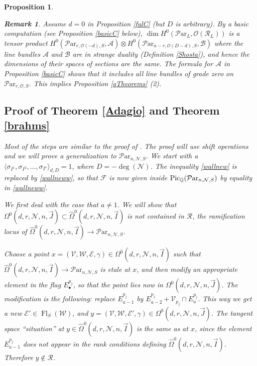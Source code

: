 \documentclass[11pt]{amsart}
\newcommand\bull{{\bullet}}
\newcommand\mf{\mathcal{F}}
\newcommand\Pic{\operatorname{Pic}}
\newcommand\me{\mathcal{E}}
\newcommand\Fl{\operatorname{Fl}}
\newcommand\mv{\mathcal{V}}
\newcommand\ma{\mathcal{A}}
\newcommand\mb{\mathcal{B}}
\newcommand\mw{\mathcal{W}}
\newcommand\mn{\mathcal{N}}
\newcommand\ParL{\mathcal{P}\text{ar}_L}
\newcommand\Par{\mathcal{P}\text{ar} }
\newtheorem{remark}[theorem]{ Remark}
\newtheorem{proposition}[theorem]{Proposition}
\numberwithin{theorem}{subsection}
\begin{document}
{\begin{proposition}
\begin{remark}\label{Bee132}
Assume $d=0$ in Proposition \ref{fulC} (but $D$ is arbitrary). By a basic computation (see Proposition \ref{basicC} below), $\dim H^0(\ParL,\mathcal{O}(\mathcal{R}_L))$ is a tensor product
$H^0({\Par}_{r,\mathcal{O}(-d),S},\ma)\otimes H^0({\Par}_{n-r,\mathcal{O}(D-d),S},\mb)$ where the line bundles $\ma$ and $\mb$ are in strange duality (Definition \ref{Shosta}), and hence the dimensions of their spaces of sections are the same. The formula for $\ma$ in Proposition \ref{basicC} shows that it includes all line bundles of grade zero on ${\Par}_{r,\mathcal{O},S}$. This implies Proposition \ref{qTheorems} (2).
\end{remark}

\subsection{Proof of Theorem  \ref{Adagio} and Theorem \ref{brahms}}\label{rumble}
Most of the steps are similar to the proof of \cite[Theorem 1.9]{BHermit}. The proof will use shift operations and we will prove  a generalization to ${\Par}_{n,\mn,S}$. We start with a $\langle\sigma_{I^1}, \sigma_{I^2},\dots,\sigma_{I^s}\rangle_{d,D}=1$, where $D=-\deg(\mn)$.  The inequality \eqref{wallnew} is replaced by \eqref{wallneww}, so that $\mf$ is now given inside  $\Pic_{\Bbb{Q}}({\Par}_{n,\mn,S})$ by equality in \eqref{wallneww}.

We first deal with the case that $a\neq 1$. We will show that $\Omega^0(d,r,\mathcal{N},n,\vec{J})\subset \widehat{\Omega}^0(d,r,\mathcal{N},n,\vec{I})$ is not contained in $\mathcal{R}$, the ramification locus of $\widehat{\Omega}^0(d,r,\mathcal{N},n,\vec{I})\to  {\Par}_{n,\mn,S}$.

Choose a point $x=(\mv,\mw,\me,\gamma)\in\Omega^0(d,r,\mathcal{N},n,\vec{I})$ such that $\widehat{\Omega}^0(d,r,\mathcal{N},n,\vec{I})\to  {\Par}_{n,\mn,S}$ is etale at $x$, and then modify an appropriate element in the flag $E^{p_j}_{\bull}$, so that the point lies now in  $\Omega^0(d,r,\mathcal{N},n,\vec{J})$. The modification is the following: replace  $E^{p_j}_{a-1}$ by $E^{p_j}_{a-2}+\mv_{p_j}\cap E^{p_j}_{a}$. This way we get a new $\me'\in \Fl_S(\mw)$, and $y=(\mv,\mw,\me',\gamma)\in\Omega^0(d,r,\mathcal{N},n,\vec{J})$. The tangent space ``situation'' at $y\in \widehat{\Omega}^0(d,r,\mathcal{N},n,\vec{I})$ is the same as at $x$, since the element $E^{p_j}_{a-1}$ does not appear in the rank conditions defining $\widehat{\Omega}^0(d,r,\mathcal{N},n,\vec{I})$. Therefore $y\not\in\mathcal{R}$.


\end{proposition}}
\end{document}
